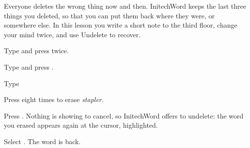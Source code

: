 Everyone deletes the wrong thing now and then.  InitechWord keeps the last
three things you deleted, so that you can put them back where they were, or
somewhere else.  In this lesson you write a short note to the third floor,
change your mind twice, and use Undelete to recover.

\begin{WPSteps}
\item Type  and press  twice.
\item Type 
and press .
\item Type 
\end{WPSteps}

\begin{WPSteps}
\item Press  eight times
to erase \textit{stapler.}
\item Press .  Nothing is showing to cancel, so
InitechWord offers to undelete: the word you erased appears again at the
cursor, highlighted.
\end{WPSteps}
\begin{WPSteps}[resume]
\item Select .  The word is back.
\end{WPSteps}

